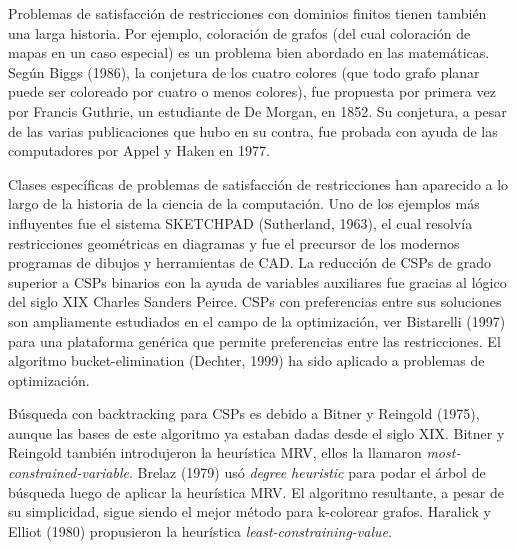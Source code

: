 Problemas de satisfacci\'on de restricciones con dominios finitos tienen tambi\'en una larga historia. Por ejemplo, coloraci\'on de grafos (del cual coloraci\'on de mapas en un caso especial) es un problema bien abordado en las matem\'aticas. Seg\'un Biggs (1986), la conjetura de los cuatro colores (que todo grafo planar puede ser coloreado por cuatro o menos colores), fue propuesta por primera vez por Francis Guthrie, un estudiante de De Morgan, en 1852. Su conjetura, a pesar de las varias publicaciones que hubo en su contra, fue probada con ayuda de las computadores por Appel y Haken en 1977.

Clases espec\'ificas de problemas de satisfacci\'on de restricciones han aparecido a lo largo de la historia de la ciencia de la computaci\'on. Uno de los ejemplos m\'as influyentes fue el sistema SKETCHPAD (Sutherland, 1963), el cual resolv\'ia restricciones geom\'etricas en diagramas y fue el precursor de los modernos programas de dibujos y herramientas de CAD. La reducci\'on de CSPs de grado superior a CSPs binarios con la ayuda de variables auxiliares fue gracias al l\'ogico del siglo XIX Charles Sanders Peirce. CSPs con preferencias entre sus soluciones son ampliamente estudiados en el campo de la optimizaci\'on, ver Bistarelli (1997) para una plataforma gen\'erica que permite preferencias entre las restricciones. El algoritmo bucket-elimination (Dechter, 1999) ha sido aplicado a problemas de optimizaci\'on.

B\'usqueda con backtracking para CSPs es debido a Bitner y Reingold (1975), aunque las bases de este algoritmo ya estaban dadas desde el siglo XIX. Bitner y Reingold tambi\'en introdujeron la heur\'istica MRV, ellos la llamaron \emph{most-constrained-variable}. Brelaz (1979) us\'o \emph{degree heuristic} para podar el \'arbol de b\'usqueda luego de aplicar la heur\'istica MRV. El algoritmo resultante, a pesar de su simplicidad, sigue siendo el mejor m\'etodo para k-colorear grafos. Haralick y Elliot (1980) propusieron la heur\'istica \emph{least-constraining-value}.

